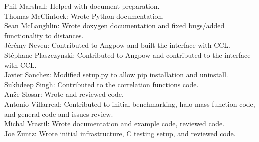 Phil Marshall: Helped with document preparation. \\
Thomas McClintock: Wrote Python documentation. \\
Sean McLaughlin: Wrote doxygen documentation and fixed bugs/added functionality to distances. \\
J\'er\'emy Neveu: Contributed to Angpow and built the interface with CCL. \\
St\'ephane Plaszczynski: Contributed to Angpow and contributed to the interface with CCL. \\
Javier Sanchez: Modified setup.py to allow pip installation and uninstall. \\
Sukhdeep Singh: Contributed to the correlation functions code. \\
An\v{z}e Slosar: Wrote and reviewed code. \\
Antonio Villarreal: Contributed to initial benchmarking, halo mass function code, and general code and issues review. \\
Michal Vrastil: Wrote documentation and example code, reviewed code. \\
Joe Zuntz: Wrote initial infrastructure, C testing setup, and reviewed code. \\
